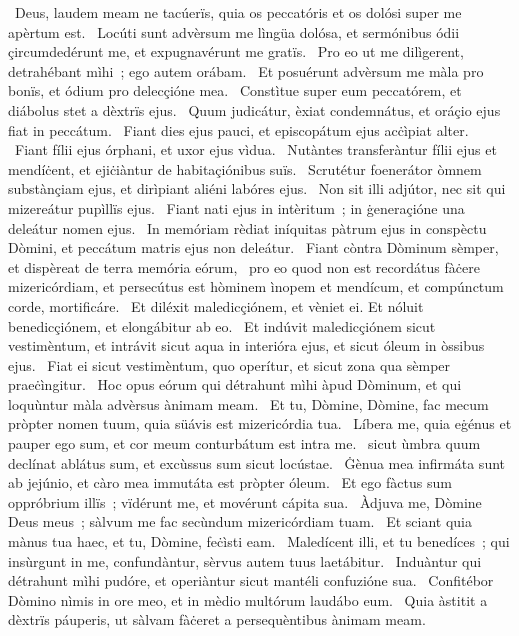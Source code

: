 \psalmChapterWithInscription{}
{ }
{%
~Deus, laudem meam ne tacúerïs, quia os peccatóris et os dolósi super me apèrtum est. 
~Locúti sunt advèrsum me lìngüa dolósa, et sermónibus ódii çircumdedérunt me, et expugnavérunt me gratïs. 
~Pro eo ut me dilìgerent, detrahébant mìhi~; ego autem orábam. 
~Et posuérunt advèrsum me màla pro bonïs, et ódium pro delecçióne mea. 
~Constìtue super eum peccatórem, et diábolus stet a dèxtrïs ejus. 
~Quum judicátur, èxiat condemnátus, et oráçio ejus fiat in peccátum. 
~Fiant dies ejus pauci, et episcopátum ejus acċìpiat alter. 
~Fiant fílii ejus órphani, et uxor ejus vìdua. 
~Nutàntes transferàntur fílii ejus et mendíċent, et ejiċiàntur de habitaçiónibus suïs. 
~Scrutétur foenerátor òmnem substànçiam ejus, et dirìpiant aliéni labóres ejus. 
~Non sit illi adjútor, nec sit qui mizereátur pupìllïs ejus. 
~Fiant nati ejus in intèritum~; in ġeneraçióne una deleátur nomen ejus. 
~In memóriam rèdiat iníquitas pàtrum ejus in conspèctu Dòmini, et peccátum matris ejus non deleátur. 
~Fiant còntra Dòminum sèmper, et dispèreat de terra memória eórum, 
~pro eo quod non est recordátus fàċere mizericórdiam, et persecútus est hòminem ìnopem et mendícum, et compúnctum corde, mortificáre. 
~Et diléxit maledicçiónem, et vèniet ei. Et nóluit benedicçiónem, et elongábitur ab eo. 
~Et indúvit maledicçiónem sicut vestimèntum, et intrávit sicut aqua in interióra ejus, et sicut óleum in òssibus ejus. 
~Fiat ei sicut vestimèntum, quo operítur, et sicut zona qua sèmper praeċìngitur. 
~Hoc opus eórum qui détrahunt mìhi àpud Dòminum, et qui loquùntur màla advèrsus ànimam meam. 
~Et tu, Dòmine, Dòmine, fac mecum pròpter nomen tuum, quia süávis est mizericórdia tua. 
~Líbera me, quia eġénus et pauper ego sum, et cor meum conturbátum est intra me. 
~sicut ùmbra quum declínat ablátus sum, et excùssus sum sicut locústae. 
~Ġènua mea infirmáta sunt ab jejúnio, et càro mea immutáta est pròpter óleum. 
~Et ego fàctus sum oppróbrium illïs~; vïdérunt me, et movérunt cápita sua. 
~Àdjuva me, Dòmine Deus meus~; sàlvum me fac secùndum mizericórdiam tuam. 
~Et sciant quia mànus tua haec, et tu, Dòmine, feċìsti eam. 
~Maledícent illi, et tu benedíces~; qui insùrgunt in me, confundàntur, sèrvus autem tuus laetábitur. 
~Induàntur qui détrahunt mìhi pudóre, et operiàntur sicut mantéli confuzióne sua. 
~Confitébor Dòmino nìmis in ore meo, et in mèdio multórum laudábo eum. 
~Quia àstitit a dèxtrïs páuperis, ut sàlvam fàċeret a persequèntibus ànimam meam. 
}
